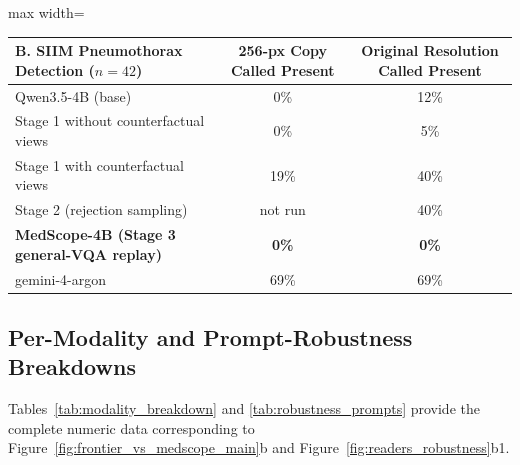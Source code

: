 \documentclass[5p,times,twocolumn,authoryear]{elsarticle}
\begin{document}
\begin{table}[!htbp]
\begin{center}
\vspace{0.2cm}
\begin{adjustbox}{max width=\linewidth}
\begin{tabular}{lcc}
\toprule
\textbf{B. SIIM Pneumothorax Detection ($n=42$)} & \textbf{256-px Copy Called Present} & \textbf{Original Resolution Called Present} \\
\midrule
Qwen3.5-4B (base) & 0\% & 12\% \\
Stage 1 without counterfactual views & 0\% & 5\% \\
Stage 1 with counterfactual views & 19\% & 40\% \\
Stage 2 (rejection sampling) & not run & 40\% \\
\textbf{MedScope-4B (Stage 3 general-VQA replay)} & \textbf{0\%} & \textbf{0\%} \\
gemini-4-argon & 69\% & 69\% \\
\bottomrule
\end{tabular}
\end{adjustbox}
\end{center}
\end{table}

\subsection{Per-Modality and Prompt-Robustness Breakdowns}
Tables~\ref{tab:modality_breakdown} and \ref{tab:robustness_prompts} provide the complete numeric data corresponding to Figure~\ref{fig:frontier_vs_medscope_main}b and Figure~\ref{fig:readers_robustness}b1.
\end{document}
